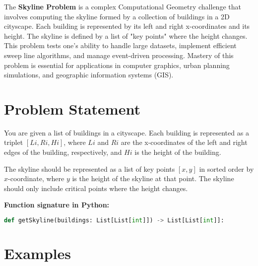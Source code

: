 
\label{chap:The_Skyline_Problem}

The \textbf{Skyline Problem} is a complex Computational Geometry challenge that involves computing the skyline formed by a collection of buildings in a 2D cityscape. Each building is represented by its left and right x-coordinates and its height. The skyline is defined by a list of "key points" where the height changes. This problem tests one's ability to handle large datasets, implement efficient sweep line algorithms, and manage event-driven processing. Mastery of this problem is essential for applications in computer graphics, urban planning simulations, and geographic information systems (GIS).

\section*{Problem Statement}

You are given a list of buildings in a cityscape. Each building is represented as a triplet \([Li, Ri, Hi]\), where \(Li\) and \(Ri\) are the x-coordinates of the left and right edges of the building, respectively, and \(Hi\) is the height of the building.

The skyline should be represented as a list of key points \([x, y]\) in sorted order by \(x\)-coordinate, where \(y\) is the height of the skyline at that point. The skyline should only include critical points where the height changes.

\textbf{Function signature in Python:}
\begin{lstlisting}[language=Python]
def getSkyline(buildings: List[List[int]]) -> List[List[int]]:
\end{lstlisting}

\section*{Examples}

